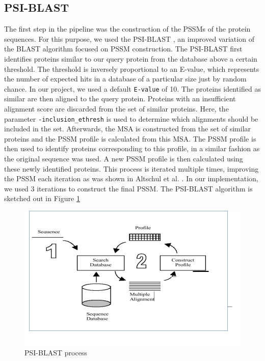 \subsection{PSI-BLAST}
The first step in the pipeline was the construction of the PSSMs of the protein sequences.
For this purpose, we used the PSI-BLAST \cite{altschul1997gapped}, an improved variation of the BLAST algorithm focused on PSSM construction.
The PSI-BLAST first identifies proteins similar to our query protein from the database above a certain threshold.
The threshold is inversely proportional to an E-value, which represents the number of expected hits in a database of a particular size just by random chance.
In our project, we used a default \texttt{E-value} of 10.
The proteins identified as similar are then aligned to the query protein.
Proteins with an insufficient alignment score are discarded from the set of similar proteins.
Here, the parameter \texttt{-inclusion\_ethresh} is used to determine which alignments should be included in the set. 
Afterwards, the MSA is constructed from the set of similar proteins and the PSSM profile is calculated from this MSA.
The PSSM profile is then used to identify proteins corresponding to this profile, in a similar fashion as the original sequence was used.
A new PSSM profile is then calculated using these newly identified proteins.
This process is iterated multiple times, improving the PSSM each iteration as was shown in Altschul et al. \cite{altschul1997gapped}.
In our implementation, we used 3 iterations to construct the final PSSM. 
The PSI-BLAST algorithm is sketched out in Figure \ref{fig:psi_blast}
\begin{figure}
    \centering
    \includegraphics[width=\linewidth]{imgs_andy/psi_blast.png}
    \caption{PSI-BLAST process}
    \label{fig:psi_blast}
\end{figure}

